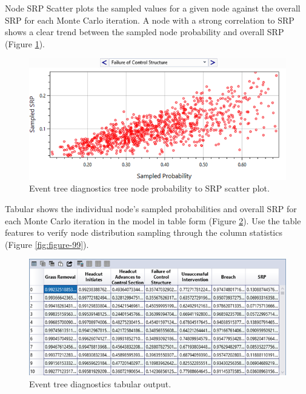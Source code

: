 \documentclass[
]{book}
\begin{document}
Node SRP Scatter plots the sampled values for a given node against the overall SRP for each Monte Carlo iteration. A node with a strong correlation to SRP shows a clear trend between the sampled node probability and overall SRP (Figure \ref{fig:figure-97}).

\begin{figure}

{\centering \includegraphics{images/figure97} 

}

\caption{Event tree diagnostics tree node probability to SRP scatter plot.}\label{fig:figure-97}
\end{figure}

Tabular shows the individual node's sampled probabilities and overall SRP for each Monte Carlo iteration in the model in table form (Figure \ref{fig:figure-98}). Use the table features to verify node distribution sampling through the column statistics (Figure \ref{fig:figure-99}).

\begin{figure}

{\centering \includegraphics{images/figure98} 

}

\caption{Event tree diagnostics tabular output.}\label{fig:figure-98}
\end{figure}
\end{document}
